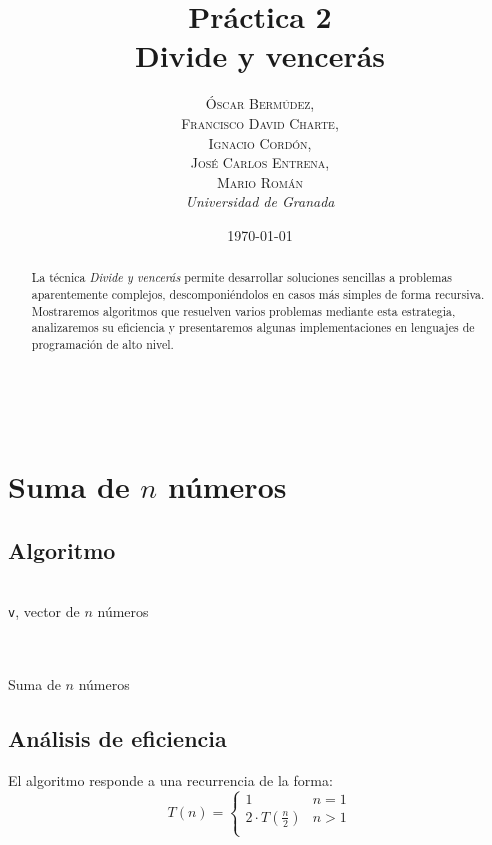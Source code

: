 \documentclass[a4paper, 11pt]{article} %
\title{\textbf{Práctica 2}\\ %
Divide y vencerás} %
\author{\textsc{Óscar Bermúdez,\\Francisco David Charte,\\Ignacio Cordón,\\José Carlos Entrena,\\Mario Román} %
\\{\textit{Universidad de Granada}}} %
\date{\today} %
\makeatletter
\renewcommand{\maketitle}{ %
\begin{flushright} %
{\LARGE\@title} %

\vspace{50pt} %

{\large\@author} %
\\\@date %

\vspace{40pt} %
\end{flushright}
}
\makeatother
\begin{document}
\maketitle %

\renewcommand{\abstractname}{Resumen} %
\begin{abstract}
La técnica \textit{Divide y vencerás} permite desarrollar soluciones sencillas a problemas aparentemente complejos, descomponiéndolos en casos más simples de forma recursiva. Mostraremos algoritmos que resuelven varios problemas mediante esta estrategia, analizaremos su eficiencia y presentaremos algunas implementaciones en lenguajes de programación de alto nivel.
\end{abstract}
{\parskip=2pt
\tableofcontents
}
\pagebreak

\section {Suma de $n$ números}
\subsection{Algoritmo}
\begin{algorithm}[H]
	\begin{algorithmic}[1]
		\REQUIRE \ \\
        	\texttt{v}, vector de $n$ números\\\
	\ELSE
    	\ENDIF \\\
	\end{algorithmic}
    \caption{Suma de $n$ números}
    \label{suma}
\end{algorithm}

\subsection{Análisis de eficiencia}
El algoritmo responde a una recurrencia de la forma:
\begin{equation}
 T(n)=\left\lbrace
	    \begin{array}{lr}
            1 & n=1\\
            2\cdot T\left(\frac{n}{2}\right) & n>1\\
            \end{array}
	    \right.
\end{equation}
\end{document}
